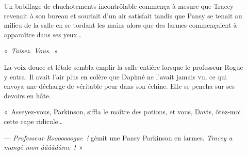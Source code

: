 Un babillage de chuchotements incontrôlable commença à mesure que Tracey revenait à son bureau et souriait d'un air satisfait tandis que Pansy se tenait au milieu de la salle en se tordant les mains alors que des larmes commençaient à apparaître dans ses yeux…

«~\emph{Taisez.
Vous.}~»

La voix douce et létale sembla emplir la salle entière lorsque le professeur Rogue y entra.
Il avait l'air plus en colère que Daphné ne l'avait jamais vu, ce qui envoya une décharge de véritable peur dans son échine.
Elle se pencha sur ses devoirs en hâte.

«~Asseyez-vous, Parkinson, siffla le maître des potions, et vous, Davis, ôtez-moi cette cape ridicule…

--- \emph{Professeur Rooooooogue~!} gémit une Pansy Parkinson en larmes.
\emph{Tracey a mangé mon ââââââme~!}~»
